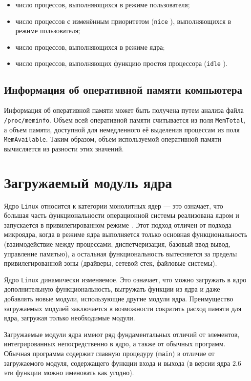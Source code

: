 \begin{itemize}
    \item число процессов, выполняющихся в режиме пользователя; 
    \item число процессов с изменённым приоритетом (\texttt{nice} \cite{nice}), выполняющихся в режиме пользователя; 
    \item число процессов, выполняющихся в режиме ядра; 
    \item число процессов, выполняющих функцию простоя процессора (\texttt{idle} \cite{idle}).
\end{itemize}


\subsection{Информация об оперативной памяти компьютера}

Информация об оперативной памяти может быть получена путем анализа файла \texttt{/proc/meminfo}. Объем всей оперативной памяти считывается из поля \texttt{MemTotal}, а объем памяти, доступной для немедленного её выделения процессам из поля \texttt{MemAvailable}. Таким образом, объем используемой оперативной памяти вычисляется из разности этих значений.


\section{Загружаемый модуль ядра}

Ядро \texttt{Linux} относится к категории монолитных ядер --- это означает, что большая часть функциональности операционной системы реализована ядром и запускается в привилегированном режиме \cite{vahalia}. Этот подход отличен от подхода микроядра, когда в режиме ядра выполняется только основная функциональность (взаимодействие между процессами, диспетчеризация, базовый ввод-вывод, управление памятью), а остальная функциональность вытесняется за пределы привилегированной зоны (драйверы, сетевой стек, файловые системы).

Ядро \texttt{Linux} динамически изменяемое. Это означает, что можно загружать в ядро дополнительную функциональность, выгружать функции из ядра и даже добавлять новые модули, использующие другие модули ядра. Преимущество загружаемых модулей \cite{vahalia} заключается в возможности сократить расход памяти для ядра, загружая только необходимые модули.

Загружаемые модули ядра имеют ряд фундаментальных отличий от элементов, интегрированных непосредственно в ядро, а также от обычных программ. Обычная программа содержит главную процедуру (\texttt{main}) в отличие от загружаемого модуля, содержащего функции входа и выхода (в версии ядра 2.6 эти функции можно именовать как угодно). 

